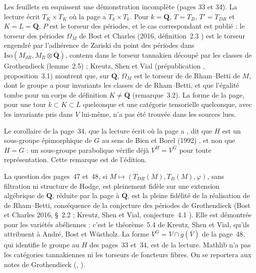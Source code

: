 {\small Les feuillets en esquissent une démonstration incomplète (pages 33 et 34). La lecture écrit $T_K \times T_K$ où la page a $T_k \times T_k$. Pour $k = \mathbf Q$, $T = T_B$, $T' = T_{DR}$ et $K = L = \overline{\mathbf Q}$, $P$ est le torseur des périodes, et le cas correspondant est publié : le torseur des périodes $\Omega_M$ de Bost et Charles (2016, définition~2.3 \cite{bostcharles2016}) est le torseur engendré par l'adhérence de Zariski du point des périodes dans $\mathrm{Iso}(M_{dR}, M_B \otimes \overline{\mathbf Q})$, contenu dans le torseur tannakien découpé par les classes de Grothendieck (lemme~2.5) ; Kreutz, Shen et Vial (prépublication \cite{kreutzshenvial}, proposition~3.1) montrent que, sur $\overline{\mathbf Q}$, $\Omega_M$ est le torseur de de Rham--Betti de $M$, dont le groupe a pour invariants les classes de de Rham--Betti, et que l'égalité tombe pour un corps de définition $K \neq \overline{\mathbf Q}$ (remarque~3.2). La forme de la page, pour une tour $k \subset K \subset L$ quelconque et une catégorie tensorielle quelconque, avec les invariants pris dans $V$ lui-même, n'a pas été trouvée dans les sources lues.

Le corollaire de la page~34, que la lecture écrit  où la page a , dit que $H$ est un sous-groupe épimorphique de $G$ au sens de Bien et Borel (1992) \cite{bienborel1992}, et non que $H = G$ : un sous-groupe parabolique vérifie déjà $V^H = V^G$ pour toute représentation. Cette remarque est de l'édition.

La question des pages~47 et~48, si $M \mapsto (T_{DR}(M), T_B(M), \varphi)$, sans filtration ni structure de Hodge, est pleinement fidèle sur une extension algébrique de $\mathbf Q$, réduite par la page à $\overline{\mathbf Q}$, est la pleine fidélité de la réalisation de de Rham--Betti, conséquence de la conjecture des périodes de Grothendieck (Bost et Charles 2016, §~2.2 \cite{bostcharles2016} ; Kreutz, Shen et Vial, conjecture~4.1 \cite{kreutzshenvial}). Elle est démontrée pour les variétés abéliennes : c'est le théorème~5.4 de Kreutz, Shen et Vial, qu'ils attribuent à André, Bost et Wüstholz. La forme $V^G = V \cap g(\overline V)$ de la page~48, qui identifie le groupe au $H$ des pages~33 et~34, est de la lecture. Mathlib n'a pas les catégories tannakiennes ni les torseurs de foncteurs fibres. On se reportera aux notes de Grothendieck (, ).\par}
